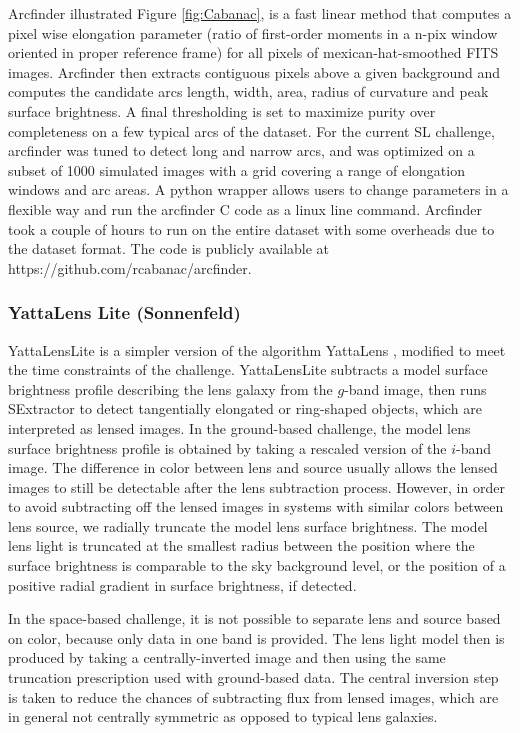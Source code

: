 \documentclass[useAMS,usenatbib]{mnras}
\begin{document}
Arcfinder \citep{2006astro.ph..6757A,2007A&A...461..813C,2012ApJ...749...38M} illustrated Figure \ref{fig:Cabanac}, is a fast linear method that computes a pixel wise elongation parameter (ratio of first-order moments in a n-pix window oriented in proper reference frame) for all pixels of mexican-hat-smoothed FITS images. Arcfinder then extracts contiguous pixels above a given background and computes the candidate arcs length, width, area, radius of curvature and peak surface brightness. A final thresholding is set to maximize purity over completeness on a few typical arcs of the dataset.
For the current SL challenge, arcfinder was tuned to detect long and narrow arcs, and was optimized on a subset of 1000 simulated images with a grid covering a range of elongation windows and arc areas.  A python wrapper allows users to change parameters in a flexible way and run the arcfinder C code as a linux line command. Arcfinder took a couple of hours to run on the entire dataset with some overheads due to the dataset format. The code is publicly available at https://github.com/rcabanac/arcfinder.

\subsubsection{YattaLens Lite (Sonnenfeld)}

YattaLensLite is a simpler version of the algorithm YattaLens \citep{2017arXiv170401585S}, modified to meet the time constraints of the challenge.
YattaLensLite subtracts a model surface brightness profile describing the lens galaxy from the $g$-band image, then runs SExtractor to detect tangentially elongated or ring-shaped objects, which are interpreted as lensed images.
In the ground-based challenge, the model lens surface brightness profile is obtained by taking a rescaled version of the $i$-band image.
The difference in color between lens and source usually allows the lensed images to still be detectable after the lens subtraction process.
However, in order to avoid subtracting off the lensed images in systems with similar colors between lens source, we radially truncate the model lens surface brightness.
The model lens light is truncated at the smallest radius between the position where the surface brightness is comparable to the sky background level, or the position of a positive radial gradient in surface brightness, if detected.

In the space-based challenge, it is not possible to separate lens and source based on color, because only data in one band is provided. The lens light model then is produced by taking a centrally-inverted image and then using the same truncation prescription used with ground-based data. The central inversion step is taken to reduce the chances of subtracting flux from lensed images, which are in general not centrally symmetric as opposed to typical lens galaxies.
\end{document}
